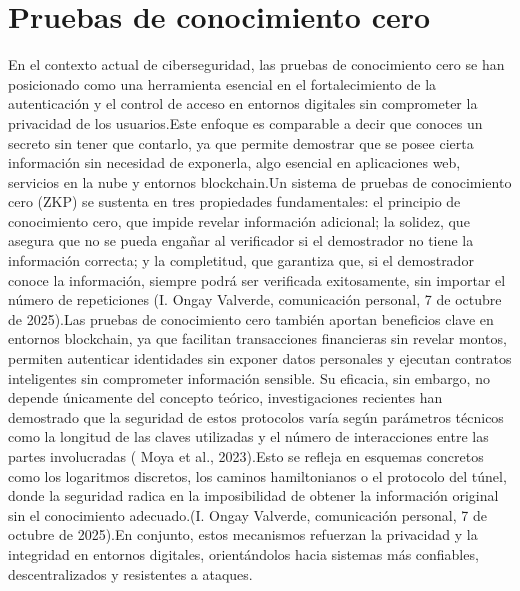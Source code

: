 \documentclass[conference]{IEEEtran}
\begin{document}
\section{Pruebas de conocimiento cero}
En el contexto actual de ciberseguridad, las pruebas de conocimiento cero se han posicionado como una herramienta esencial en el fortalecimiento de la autenticación y el control de acceso en entornos digitales sin comprometer la privacidad de los usuarios.Este enfoque es comparable a decir que conoces un secreto sin tener que contarlo, ya que permite demostrar que se posee cierta información sin necesidad de exponerla, algo esencial en aplicaciones web, servicios en la nube y entornos blockchain.Un sistema de pruebas de conocimiento cero (ZKP) se sustenta en tres propiedades fundamentales: el principio de conocimiento cero, que impide revelar información adicional; la solidez, que asegura que no se pueda engañar al verificador si el demostrador no tiene la información correcta; y la completitud, que garantiza que, si el demostrador conoce la información, siempre podrá ser verificada exitosamente, sin importar el número de repeticiones (I. Ongay Valverde, comunicación personal, 7 de octubre de 2025).Las pruebas de conocimiento cero también aportan beneficios clave en entornos blockchain, ya que facilitan transacciones financieras sin revelar montos, permiten autenticar identidades sin exponer datos personales y ejecutan contratos inteligentes sin comprometer información sensible. Su eficacia, sin embargo, no depende únicamente del concepto teórico, investigaciones recientes han demostrado que la seguridad de estos protocolos varía según parámetros técnicos como la longitud de las claves utilizadas y el número de interacciones entre las partes involucradas ( Moya et al., 2023).Esto se refleja en esquemas concretos como los logaritmos discretos, los caminos hamiltonianos o el protocolo del túnel, donde la seguridad radica en la imposibilidad de obtener la información original sin el conocimiento adecuado.(I. Ongay Valverde, comunicación personal, 7 de octubre de 2025).En conjunto, estos mecanismos refuerzan la privacidad y la integridad en entornos digitales, orientándolos hacia sistemas más confiables, descentralizados y resistentes a ataques.
\end{document}
